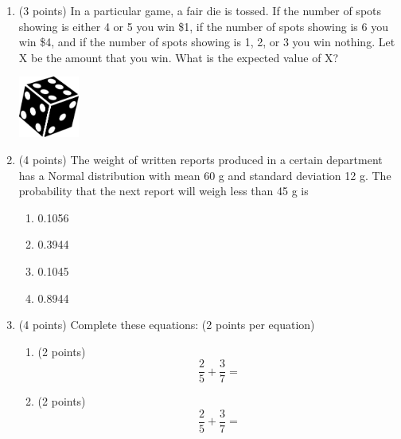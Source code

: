 \documentclass[letterpaper,12pt,addpoints]{exam}
\begin{document}
\begin{enumerate}

\clearpage
\item (3 points) In a particular game, a fair die is tossed.  If the number of spots showing is either 4 or 5 you win \$1, if the number of spots showing is 6 you win \$4, and if the number of spots showing is 1, 2, or 3 you win nothing.  Let X be the amount that you win. 
What is the expected value of X?

\vspace{0.2cm}
\begin{center}
\includegraphics[width=2cm]{dice_simple.png}
\end{center}

\vspace{2.7in}

\item (4 points) The weight of written reports produced in a certain department has a Normal distribution with mean 60 g and standard deviation 12 g. The probability that the next report will weigh less than 45 g is

\begin{enumerate}
\item 0.1056
\item  0.3944
\item  0.1045
\item  0.8944
\end{enumerate}


\clearpage
\item (4 points) Complete these equations: (2 points per equation)

\begin{enumerate}
\item (2 points) 
\begin{equation*}
\frac{2}{5} + \frac{3}{7} = 
\end{equation*}

\vspace{7cm}

\item (2 points)
\begin{equation*}
\frac{2}{5} + \frac{3}{7} = 
\end{equation*}

\end{enumerate}


\end{enumerate}
\end{document}
